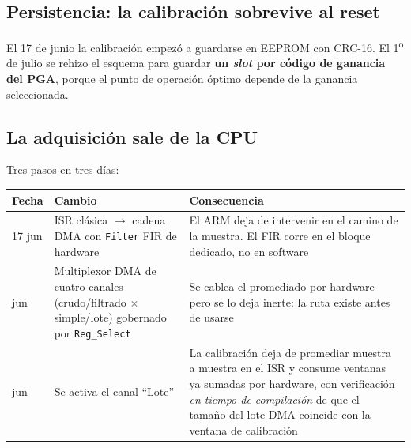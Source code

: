 
\subsection{Persistencia: la calibraci\'on sobrevive al reset}

El 17 de junio la calibraci\'on empez\'o a guardarse en EEPROM con CRC-16. El
1\textsuperscript{o} de julio se rehizo el esquema para guardar
\textbf{un \emph{slot} por c\'odigo de ganancia del PGA}, porque el punto de
operaci\'on \'optimo depende de la ganancia seleccionada.


\subsection{La adquisici\'on sale de la CPU}

Tres pasos en tres d\'ias:

\begin{center}\small
\begin{tabularx}{\textwidth}{@{}l X X@{}}
\toprule
\textbf{Fecha} & \textbf{Cambio} & \textbf{Consecuencia} \\
\midrule
17 jun & ISR cl\'asica $\to$ cadena DMA con \texttt{Filter} FIR de hardware &
El ARM deja de intervenir en el camino de la muestra. El FIR corre en el bloque dedicado, no en software \\
\addlinespace[2pt]
18 jun & Multiplexor DMA de cuatro canales (crudo/filtrado $\times$ simple/lote) gobernado por \texttt{Reg\_Select} &
Se cablea el promediado por hardware pero se lo deja inerte: la ruta existe antes de usarse \\
\addlinespace[2pt]
19 jun & Se activa el canal ``Lote'' &
La calibraci\'on deja de promediar muestra a muestra en el ISR y consume ventanas ya sumadas por hardware, con verificaci\'on \emph{en tiempo de compilaci\'on} de que el tama\~no del lote DMA coincide con la ventana de calibraci\'on \\
\bottomrule
\end{tabularx}
\end{center}

